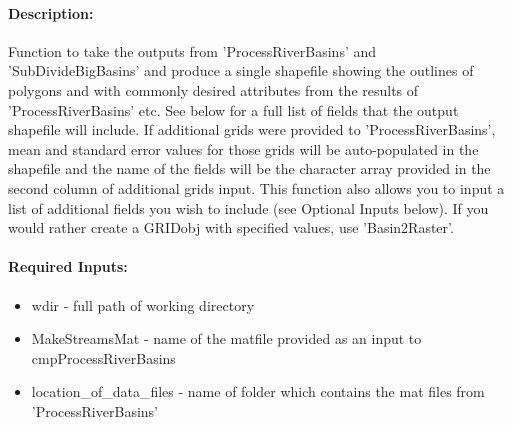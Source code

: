 \paragraph{Description:}
Function to take the outputs from 'ProcessRiverBasins' and 'SubDivideBigBasins' and produce a single shapefile showing the outlines of polygons
and with commonly desired attributes from the results of 'ProcessRiverBasins' etc. See below for a full list of fields that the output shapefile
will include. If additional grids were provided to 'ProcessRiverBasins', mean and standard error values for those grids will be auto-populated in
the shapefile and the name of the fields will be the character array provided in the second column of additional grids input. This function also
allows you to input a list of additional fields you wish to include (see Optional Inputs below). If you would rather create a GRIDobj with specified
values, use 'Basin2Raster'.

\paragraph{Required Inputs:}
\begin{itemize}
\item wdir - full path of working directory
\item MakeStreamsMat - name of the matfile provided as an input to cmpProcessRiverBasins
\item location\_of\_data\_files - name of folder which contains the mat files from 'ProcessRiverBasins'
\end{itemize}

